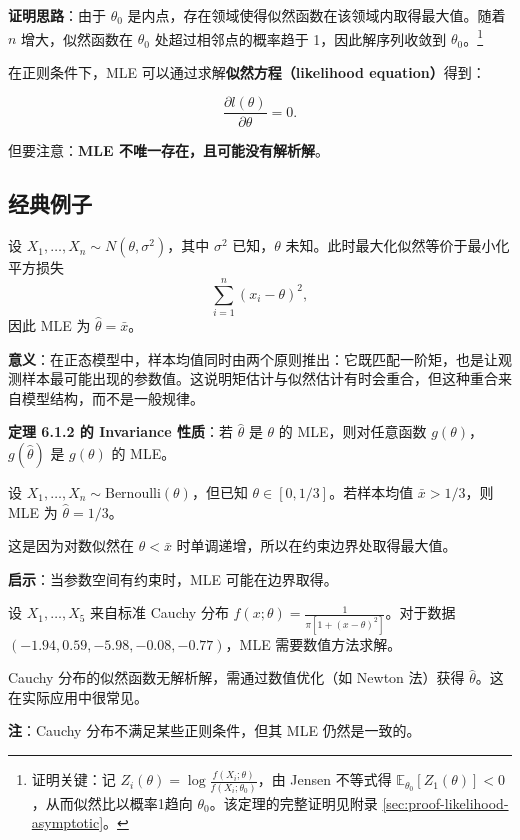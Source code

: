 \textbf{证明思路}：由于 $\theta_0$ 是内点，存在领域使得似然函数在该领域内取得最大值。随着 $n$ 增大，似然函数在 $\theta_0$ 处超过相邻点的概率趋于 1，因此解序列收敛到 $\theta_0$。\footnote{证明关键：记 $Z_i(\theta) = \log\frac{f(X_i;\theta)}{f(X_i;\theta_0)}$，由 Jensen 不等式得 $\mathbb{E}_{\theta_0}[Z_1(\theta)] < 0$，从而似然比以概率1趋向 $\theta_0$。该定理的完整证明见附录 \cref{sec:proof-likelihood-asymptotic}。}

在正则条件下，MLE 可以通过求解\textbf{似然方程（likelihood equation）}得到：

\[
\frac{\partial l(\theta)}{\partial \theta} = 0.
\label{eq:likelihood-equation}
\]

但要注意：\textbf{MLE 不唯一存在，且可能没有解析解}。

\subsection{经典例子}

\begin{example}\label{ex:normal-mle}
设 $X_1, \ldots, X_n \sim N(\theta, \sigma^2)$，其中 $\sigma^2$ 已知，$\theta$ 未知。此时最大化似然等价于最小化平方损失
\[
\sum_{i=1}^n (x_i-\theta)^2,
\]
因此 MLE 为 $\widehat{\theta}=\bar{x}$。

\textbf{意义}：在正态模型中，样本均值同时由两个原则推出：它既匹配一阶矩，也是让观测样本最可能出现的参数值。这说明矩估计与似然估计有时会重合，但这种重合来自模型结构，而不是一般规律。
\end{example}

\textbf{定理 6.1.2 的 Invariance 性质}：若 $\widehat{\theta}$ 是 $\theta$ 的 MLE，则对任意函数 $g(\theta)$，$g(\widehat{\theta})$ 是 $g(\theta)$ 的 MLE。

\begin{example}\label{ex:constrained-mle}
设 $X_1, \ldots, X_n \sim \text{Bernoulli}(\theta)$，但已知 $\theta \in [0, 1/3]$。若样本均值 $\bar{x} > 1/3$，则 MLE 为 $\widehat{\theta} = 1/3$。

这是因为对数似然在 $\theta < \bar{x}$ 时单调递增，所以在约束边界处取得最大值。

\textbf{启示}：当参数空间有约束时，MLE 可能在边界取得。
\end{example}

\begin{example}\label{ex:cauchy-mle}
设 $X_1, \ldots, X_5$ 来自标准 Cauchy 分布 $f(x;\theta) = \frac{1}{\pi[1+(x-\theta)^2]}$。对于数据 $(-1.94, 0.59, -5.98, -0.08, -0.77)$，MLE 需要数值方法求解。

Cauchy 分布的似然函数无解析解，需通过数值优化（如 Newton 法）获得 $\widehat{\theta}$。这在实际应用中很常见。

\textbf{注}：Cauchy 分布不满足某些正则条件，但其 MLE 仍然是一致的。
\end{example}

